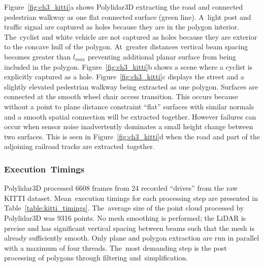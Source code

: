 Figure~\ref{fig:ch3_kitti}a shows Polylidar3D extracting the road and connected pedestrian walkway as one flat connected surface (green line). A~light post and traffic signal are captured as holes because they are in the polygon interior. The~cyclist and white vehicle are not captured as holes because they are exterior to the concave hull of the polygon. At~greater distances vertical beam spacing becomes greater than $l_{max}$ preventing additional planar surface from being included in the polygon. Figure~\ref{fig:ch3_kitti}b shows a scene where a cyclist is explicitly captured as a hole. 
Figure~\ref{fig:ch3_kitti}c displays the street and a slightly elevated pedestrian walkway being extracted as one polygon. Surfaces are connected at the smooth wheel chair access transition. This occurs because without a point to plane distance constraint ``flat'' surfaces with similar normals and a smooth spatial connection will be extracted together.  However failures can occur when sensor noise inadvertently dominates a small height change between two surfaces. This is seen in Figure~\ref{fig:ch3_kitti}d when the road and part of the adjoining railroad tracks are extracted~together. 


\subsubsection{Execution~Timings}\label{sec:ch3_results_kitti_exec}

Polylidar3D processed 6608 frames from 24 recorded ``drives'' from the raw KITTI dataset. Mean~execution timings for each processing step are presented in Table~\ref{table:kitti_timings}.  The~average size of the point cloud processed by Polylidar3D was 9316 points. No mesh smoothing is performed; the LiDAR is precise and has significant vertical spacing between beams such that the mesh is already sufficiently smooth. Only plane and polygon extraction are run in parallel with a maximum of four threads. The~most demanding step is the post processing of polygons through filtering and~simplification. 


